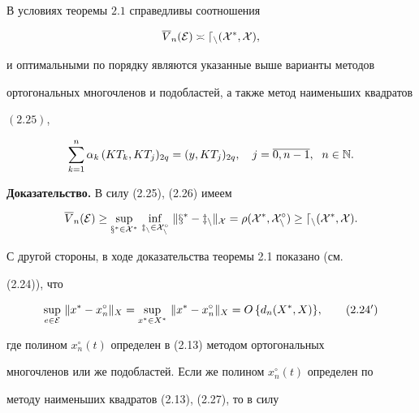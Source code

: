 \begin{thms}


В условиях теоремы $2.1$ справедливы соотношения


$$


\overline{V}_n(\cal E)\asymp d_n(X^*,X),


$$


и оптимальными по порядку являются указанные выше варианты методов


ортогональных многочленов и подобластей, а также метод наименьших квадратов


$(2.25)$,


\begin{equation}


\sum_{k=1}^n\alpha_k\, (KT_k,KT_j)_{2q}=(y,KT_j)_{2q},\quad


j=\overline{0,n-1},\ \; n\in \Bbb N.


\end{equation}


\end{thms}





{\bf Доказательство.} В силу (2.25), (2.26) имеем


\begin{equation}


\overline{V}_n(\cal E)\geq \sup_{x^*\in X^*}


\,\inf_{\mathstrut z_n\in X_n^\circ}\,


\|x^*-z_n\|_X =\rho(X^*,X_n^\circ)\geq d_n(X^*,X).


\end{equation}


С другой стороны, в ходе доказательства теоремы 2.1 показано (см.


(2.24)), что


\begin{equation}


\sup_{e\in \cal E}\, \|x^*-x_n^\circ\|_X =\sup_{x^*\in X^*}\,


\|x^*-x_n^\circ\|_X =O\, \{ d_n(X^*,X)\} ,


\tag{$2.24'$}


\end{equation}


где полином $x_n^\circ (t)$ определен в (2.13) методом ортогональных


многочленов или же подобластей. Если же полином $x_n^\circ(t)$ определен по


методу наименьших квадратов (2.13), (2.27), то в силу



